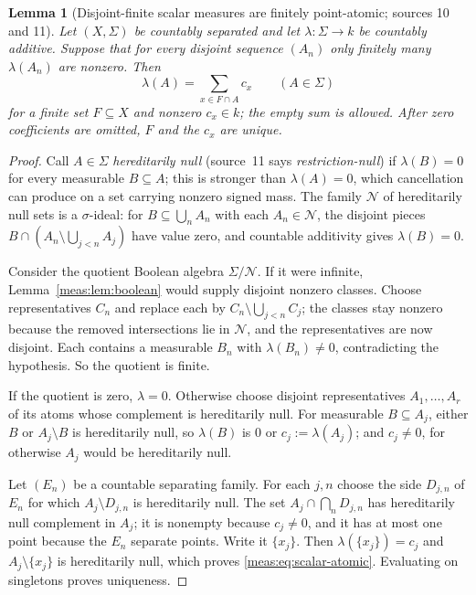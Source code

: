 \documentclass[11pt]{article}
\numberwithin{equation}{section}
\newtheorem{lemma}[theorem]{Lemma}
\theoremstyle{definition}
\theoremstyle{remark}
\begin{document}
\begin{lemma}[Disjoint-finite scalar measures are finitely point-atomic;
sources 10 and 11]\label{meas:lem:scalar}
Let $(X,\Sigma)$ be countably separated and let $\lambda:\Sigma\to k$ be
countably additive. Suppose that for every disjoint sequence $(A_n)$ only
finitely many $\lambda(A_n)$ are nonzero. Then
\begin{equation}\label{meas:eq:scalar-atomic}
 \lambda(A)=\sum_{x\in F\cap A}c_x\qquad(A\in\Sigma)
\end{equation}
for a finite set $F\subseteq X$ and nonzero $c_x\in k$; the empty sum is
allowed. After zero coefficients are omitted, $F$ and the $c_x$ are unique.
\end{lemma}
\begin{proof}
Call $A\in\Sigma$ \emph{hereditarily null} (source~11 says
\emph{restriction-null}) if $\lambda(B)=0$ for every measurable $B\subseteq A$;
this is stronger than $\lambda(A)=0$, which cancellation can produce on a set
carrying nonzero signed mass. The family $\mathcal N$ of hereditarily null sets
is a $\sigma$-ideal: for $B\subseteq\bigcup_nA_n$ with each $A_n\in\mathcal N$,
the disjoint pieces $B\cap(A_n\setminus\bigcup_{j<n}A_j)$ have value zero, and
countable additivity gives $\lambda(B)=0$.

Consider the quotient Boolean algebra $\Sigma/\mathcal N$. If it were infinite,
Lemma~\ref{meas:lem:boolean} would supply disjoint nonzero classes. Choose
representatives $C_n$ and replace each by $C_n\setminus\bigcup_{j<n}C_j$; the
classes stay nonzero because the removed intersections lie in $\mathcal N$,
and the representatives are now disjoint. Each contains a measurable $B_n$ with
$\lambda(B_n)\ne0$, contradicting the hypothesis. So the quotient is finite.

If the quotient is zero, $\lambda=0$. Otherwise choose disjoint representatives
$A_1,\ldots,A_r$ of its atoms whose complement is hereditarily null. For
measurable $B\subseteq A_j$, either $B$ or $A_j\setminus B$ is hereditarily
null, so $\lambda(B)$ is $0$ or $c_j:=\lambda(A_j)$; and $c_j\ne0$, for otherwise
$A_j$ would be hereditarily null.

Let $(E_n)$ be a countable separating family. For each $j,n$ choose the side
$D_{j,n}$ of $E_n$ for which $A_j\setminus D_{j,n}$ is hereditarily null. The
set $A_j\cap\bigcap_nD_{j,n}$ has hereditarily null complement in $A_j$; it is
nonempty because $c_j\ne0$, and it has at most one point because the $E_n$
separate points. Write it $\{x_j\}$. Then $\lambda(\{x_j\})=c_j$ and
$A_j\setminus\{x_j\}$ is hereditarily null, which proves
\eqref{meas:eq:scalar-atomic}. Evaluating on singletons proves uniqueness.
\end{proof}
\end{document}
